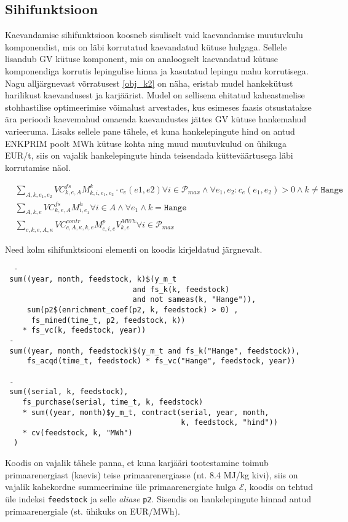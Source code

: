 \documentclass[10pt,a4paper]{article}
\begin{document}
\subsection{Sihifunktsioon}
Kaevandamise sihifunktsioon koosneb sisuliselt vaid kaevandamise muutuvkulu komponendist, mis on läbi korrutatud kaevandatud kütuse hulgaga. Sellele lisandub GV kütuse komponent, mis on analoogselt kaevandatud kütuse komponendiga korrutis lepingulise hinna ja kasutatud lepingu mahu korrutisega. Nagu alljärgnevast võrratusest \ref{obj_k2} on näha, eristab mudel hankekütust harilikust kaevandusest ja karjäärist. Mudel on sellisena ehitatud kaheastmelise stohhastilise optimeerimise võimalust arvestades, kus esimeses faasis otsustatakse ära perioodi kaevemahud omaenda kaevandustes jättes GV kütuse hankemahud varieeruma. Lisaks sellele pane tähele, et kuna hankelepingute hind on antud ENKPRIM poolt MWh kütuse kohta ning muud muutuvkulud on ühikuga EUR/t, siis on vajalik hankelepingute hinda teisendada kütteväärtusega läbi korrutamise näol.

\begin{align}
&\sum_{A,k,e_1,e_2} VC^{fs}_{k, e, A} M^k_{k,i,e_1, e_2} \cdot c_e(e1, e2)  \forall i \in \mathcal{P}_{max} \land \forall e_1, e_2 : c_e(e_1, e_2)>0 \land k \neq \texttt{Hange} \label{obj_k1} \\
&\sum_{A,k,e} VC^{fs}_{k, e, A} M^h_{i,e_1}  \forall i \in A \land \forall e_1 \land k = \texttt{Hange} \label{obj_k2}\\
&\sum_{c, k, e, A, \kappa} VC^{contr}_{c, A, \kappa, k, e} M^p_{c,i,e} V^{MWh}_{k,e}  \forall i \in \mathcal{P}_{max} \label{obj_k3}
\end{align}

Need kolm sihifunktsiooni elementi on koodis kirjeldatud järgnevalt.
\begin{verbatim}
  -
 sum((year, month, feedstock, k)$(y_m_t
                             and fs_k(k, feedstock)
                             and not sameas(k, "Hange")),
     sum(p2$(enrichment_coef(p2, k, feedstock) > 0) ,
      fs_mined(time_t, p2, feedstock, k))
    * fs_vc(k, feedstock, year))
 -
 sum((year, month, feedstock)$(y_m_t and fs_k("Hange", feedstock)),
     fs_acqd(time_t, feedstock) * fs_vc("Hange", feedstock, year))

 -
 sum((serial, k, feedstock),
    fs_purchase(serial, time_t, k, feedstock)
    * sum((year, month)$y_m_t, contract(serial, year, month, 
                                        k, feedstock, "hind"))
    * cv(feedstock, k, "MWh")
  )
\end{verbatim}
Koodis on vajalik tähele panna, et kuna karjääri tootestamine toimub primaarenergiast (kaevis) teise primaarenergiasse (nt. 8.4 MJ/kg kivi), siis on vajalik kahekordne summeerimine üle primaarenergiate hulga $\mathcal{E}$, koodis on tehtud üle indeksi \texttt{feedstock} ja selle \emph{aliase} \texttt{p2}. Sisendis on hankelepingute hinnad antud primaarenergiale (st. ühikuks on EUR/MWh).
\end{document}
